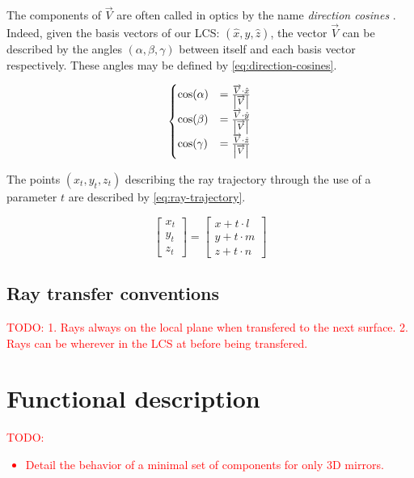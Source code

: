 The components of $\overrightarrow{V}$ are often called in optics by the name
\emph{direction cosines} \cite{mathworld:direction-cosine}. Indeed, given the
basis vectors of our \gls{LCS}: $(\hat{x}, \hat{y}, \hat{z})$, the vector
$\overrightarrow{V}$ can be described by the angles $(\alpha, \beta, \gamma)$
between itself and each basis vector respectively. These angles may be defined
by \cref{eq:direction-cosines}.

\begin{equation} \label{eq:direction-cosines}
\begin{cases}
\cos(\alpha) &= \frac{\overrightarrow{V} \cdot \hat{x}}
                     {\abs{\overrightarrow{V}}} \\
\cos(\beta) &= \frac{\overrightarrow{V} \cdot \hat{y}}
                    {\abs{\overrightarrow{V}}} \\
\cos(\gamma) &= \frac{\overrightarrow{V} \cdot \hat{z}}
                     {\abs{\overrightarrow{V}}}
\end{cases}
\end{equation}

The points $(x_t, y_t, z_t)$ describing the ray trajectory through the use of a parameter $t$
are described by \cref{eq:ray-trajectory}.

\begin{equation} \label{eq:ray-trajectory}
\begin{bmatrix}
x_t \\ y_t \\ z_t
\end{bmatrix} =
\begin{bmatrix}
x + t \cdot l \\
y + t \cdot m \\
z + t \cdot n
\end{bmatrix}
\end{equation}

\subsection{Ray transfer conventions}
\textcolor{red}{TODO:
1. Rays always on the local plane when transfered to the next surface.
2. Rays can be wherever in the LCS at before being transfered.}

\section{Functional description}

\textcolor{red}{TODO: \begin{itemize}
\item Detail the behavior of a minimal set of components for
only 3D mirrors.
\end{itemize}}

